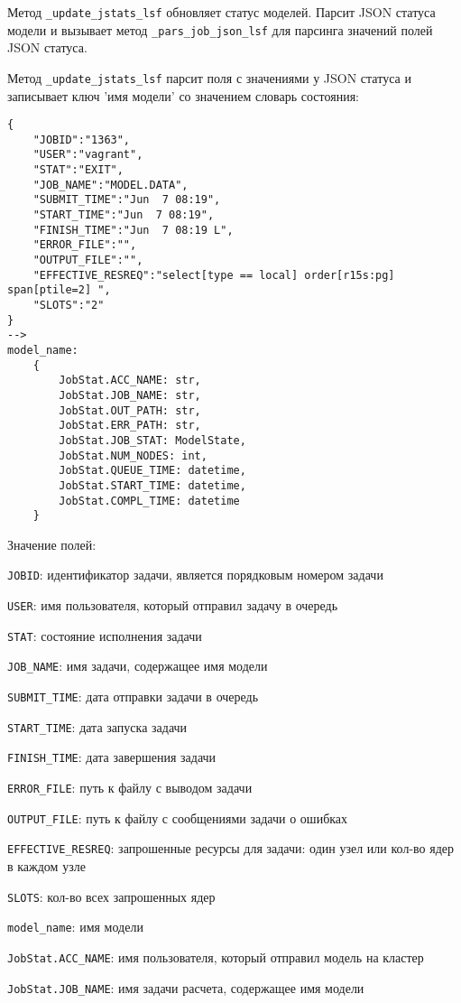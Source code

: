 Метод \lstinline{_update_jstats_lsf} обновляет статус моделей. Парсит JSON статуса модели и вызывает метод \lstinline{_pars_job_json_lsf} для парсинга значений полей JSON статуса.

Метод \lstinline{_update_jstats_lsf} парсит поля с значениями у JSON статуса и записывает ключ 'имя модели' со значением словарь состояния:
\begin{lstlisting}
{
    "JOBID":"1363",
    "USER":"vagrant",
    "STAT":"EXIT",
    "JOB_NAME":"MODEL.DATA",
    "SUBMIT_TIME":"Jun  7 08:19",
    "START_TIME":"Jun  7 08:19",
    "FINISH_TIME":"Jun  7 08:19 L",
    "ERROR_FILE":"",
    "OUTPUT_FILE":"",
    "EFFECTIVE_RESREQ":"select[type == local] order[r15s:pg] span[ptile=2] ",
    "SLOTS":"2"
}
-->
model_name:
    {
        JobStat.ACC_NAME: str,
        JobStat.JOB_NAME: str,
        JobStat.OUT_PATH: str,
        JobStat.ERR_PATH: str,
        JobStat.JOB_STAT: ModelState,
        JobStat.NUM_NODES: int,
        JobStat.QUEUE_TIME: datetime,
        JobStat.START_TIME: datetime,
        JobStat.COMPL_TIME: datetime
    }
\end{lstlisting}

Значение полей:

\lstinline{JOBID}: идентификатор задачи, является порядковым номером задачи

\lstinline{USER}: имя пользователя, который отправил задачу в очередь

\lstinline{STAT}: состояние исполнения задачи

\lstinline{JOB_NAME}: имя задачи, содержащее имя модели

\lstinline{SUBMIT_TIME}: дата отправки задачи в очередь

\lstinline{START_TIME}: дата запуска задачи

\lstinline{FINISH_TIME}: дата завершения задачи

\lstinline{ERROR_FILE}: путь к файлу с выводом задачи

\lstinline{OUTPUT_FILE}: путь к файлу с сообщениями задачи о ошибках

\lstinline{EFFECTIVE_RESREQ}: запрошенные ресурсы для задачи: один узел или кол-во ядер в каждом узле

\lstinline{SLOTS}: кол-во всех запрошенных ядер

\lstinline{model_name}: имя модели

\lstinline{JobStat.ACC_NAME}: имя пользователя, который отправил модель на кластер

\lstinline{JobStat.JOB_NAME}: имя задачи расчета, содержащее имя модели

